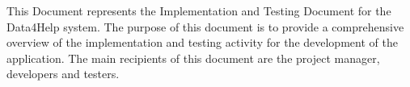 This Document represents the Implementation and Testing Document for the Data4Help system.
The purpose of this document is to provide a comprehensive overview of the implementation and testing activity for the development of the application. 
The main recipients of this document are the project manager, developers and testers.
